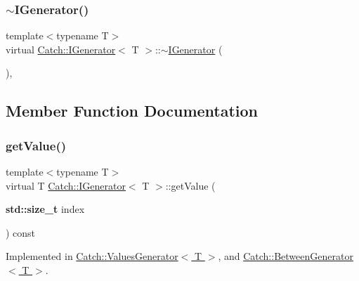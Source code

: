 \subsubsection{\texorpdfstring{$\sim$\+I\+Generator()}{~IGenerator()}}
{\footnotesize\ttfamily template$<$typename T$>$ \\
virtual \hyperlink{struct_catch_1_1_i_generator}{Catch\+::\+I\+Generator}$<$ T $>$\+::$\sim$\hyperlink{struct_catch_1_1_i_generator}{I\+Generator} (\begin{DoxyParamCaption}{ }\end{DoxyParamCaption})\hspace{0.3cm}{\ttfamily [inline]}, {\ttfamily [virtual]}}



\subsection{Member Function Documentation}
\mbox{\label{struct_catch_1_1_i_generator_ad69e937cb66dba3ed9429c42abf4fce3}} 
\subsubsection{\texorpdfstring{get\+Value()}{getValue()}}
{\footnotesize\ttfamily template$<$typename T$>$ \\
virtual T \hyperlink{struct_catch_1_1_i_generator}{Catch\+::\+I\+Generator}$<$ T $>$\+::get\+Value (\begin{DoxyParamCaption}\item[{\textbf{ std\+::size\+\_\+t}}]{index }\end{DoxyParamCaption}) const\hspace{0.3cm}{\ttfamily [pure virtual]}}



Implemented in \hyperlink{class_catch_1_1_values_generator_a9674c8b70d562d2d68154de92dd1810a}{Catch\+::\+Values\+Generator$<$ T $>$}, and \hyperlink{class_catch_1_1_between_generator_a913f74bb0c23b3bc0127abfffdabbd94}{Catch\+::\+Between\+Generator$<$ T $>$}.

\mbox{\label{struct_catch_1_1_i_generator_a2e317253b03e838b6065ce69719a198e}} 
